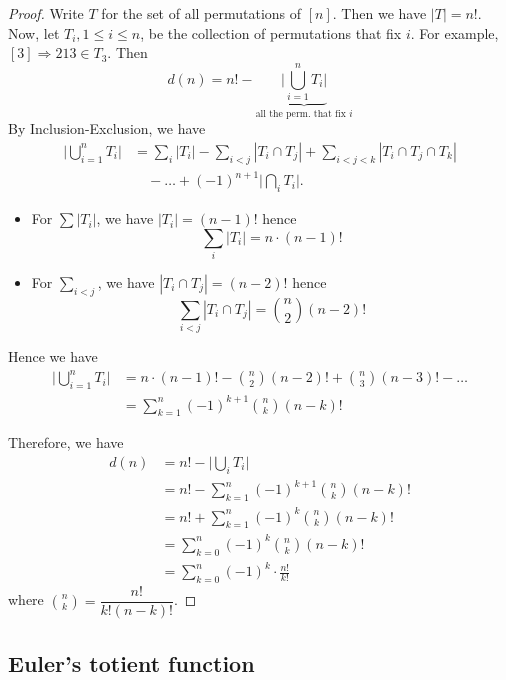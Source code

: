 \documentclass[11pt]{article}
\begin{document}
    \begin{proof}
        Write $T$ for the set of all permutations of \([n]\). Then we have \(|T| = n!\). Now, let \(T_i, 1 \leq i \leq n\), be the collection of permutations that fix $i$. For example, \([3] \Rightarrow 213 \in T_3\). Then
        \begin{equation*}
            d(n) = n! - \underbrace{\bigg| \bigcup_{i=1}^{n} T_i \bigg|}_{\text{all the perm. that fix $i$}}
        \end{equation*}
        By Inclusion-Exclusion, we have 
        \begin{align*}
            \bigg| \bigcup_{i=1}^{n} T_i \bigg| &= \sum_{i} |T_i| - \sum_{i<j} |T_i \cap T_j| + \sum_{i < j < k} |T_i \cap T_j \cap T_k | \\
            & \quad - \dots + (-1)^{n+1} \bigg| \bigcap_{i} T_i \bigg|.
        \end{align*}
        \begin{itemize}
            \item For \(\sum |T_i|\), we have \(|T_i| = (n-1)!\) hence \[\sum_{i} |T_i| = n \cdot (n-1)!\]
            \item For \(\sum_{i<j}\), we have \(|T_i \cap T_j| = (n-2)!\) hence \[\sum_{i<j} |T_i \cap T_j| = \binom{n}{2} (n-2)!\]
        \end{itemize}
        Hence we have 
        \begin{align*}
            \bigg| \bigcup_{i=1}^{n} T_i \bigg| &= n \cdot (n-1)! - \binom{n}{2} (n-2)! + \binom{n}{3} (n-3)! - \dots \\
            &= \sum_{k=1}^{n} (-1)^{k+1} \binom{n}{k} (n-k)!
        \end{align*}

        Therefore, we have 
        \begin{align*}
            d(n) &= n! - \bigg| \bigcup_{i} T_i \bigg| \\
                 &= n! - \sum_{k=1}^{n} (-1)^{k+1} \binom{n}{k} (n-k)! \\
                 &= n! + \sum_{k=1}^{n} (-1)^k \binom{n}{k} (n-k)! \\
                 &= \sum_{k=0}^{n} (-1)^k \binom{n}{k} (n-k)! \\
                 &= \sum_{k=0}^{n} (-1)^k \cdot \frac{n!}{k!}
        \end{align*}
        where \(\binom{n}{k} = \dfrac{n!}{k! (n-k)!}\). 
    \end{proof}

    \subsection{Euler's totient function}
\end{document}
